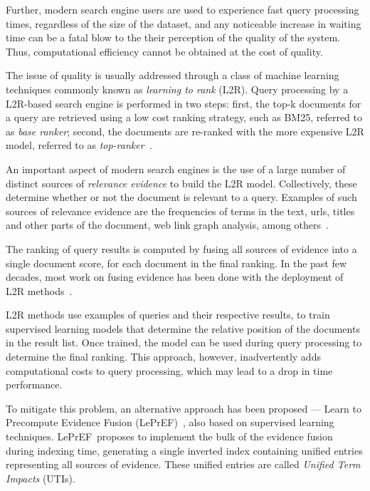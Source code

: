 \documentclass[preprint,review,10pt,3p]{elsarticle}
\begin{document}
Further, modern search engine users are used to experience fast query processing times, regardless of the size of the dataset, and any noticeable increase in waiting time can be a fatal blow to the their perception of the quality of the system. Thus,
computational efficiency cannot be obtained at the cost of quality. 

The issue of quality is usually addressed through a class of machine learning techniques commonly known as \textit{learning to rank} (L2R). Query processing by a L2R-based search engine is performed in two steps: first, the top-k documents for a query are retrieved using a low cost ranking strategy, such as BM25, referred to as \emph{base ranker}; second, the documents are re-ranked with the more expensive L2R model, referred to as \emph{top-ranker}~\cite{capannini2016quality}.

An important aspect of modern search engines is the use of a large number of distinct sources of \emph{relevance evidence} to build the L2R model. Collectively, these determine whether or not the document is relevant to a query. Examples of such sources of relevance evidence are the frequencies of terms in the text, urls, titles and other parts of the document, web link graph analysis, among others~\cite{baezaribeiro2011modinforet}. 

The ranking of query results is computed by fusing all sources of evidence into a single document score, for each document in the final ranking. In the past few decades, most work on fusing evidence has been done with the deployment of L2R methods~\cite{liu11:L2RfIR}.

L2R methods use examples of queries and their respective results, to train supervised learning models that determine the relative position of the documents in the result list. Once trained, the model can be used during query processing to determine the final ranking. This approach, however, inadvertently adds computational costs to query processing, which may lead to a drop in time performance.

\newcommand{\lepref}{LePrEF}
\newcommand{\lambdamart}{LambdaMART}

To mitigate this problem, an alternative approach has been proposed --- Learn to Precompute Evidence Fusion (\lepref)~\cite{costa2012lepref}, also based on supervised learning techniques. \lepref\ proposes to implement the bulk of the evidence fusion during indexing time, generating a single inverted index containing unified entries representing all sources of evidence. These unified entries are called \textit{Unified Term Impacts} (UTIs). 
\end{document}

